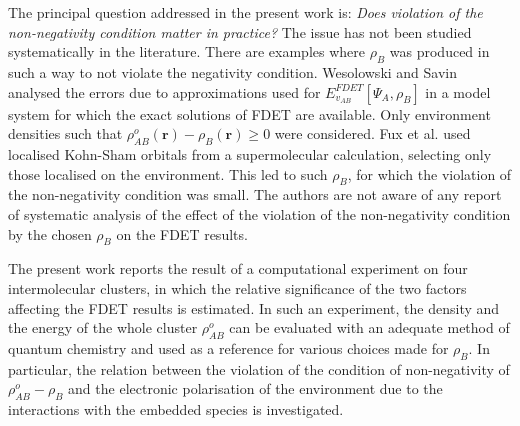\documentclass[amsmath,amssymb,preprint,aip,jcp]{revtex4-1}
\begin{document}
The principal question addressed in the present work is: {\it Does violation of the non-negativity condition matter in practice?} 
The issue has not been studied systematically in the literature.
 There are examples where $\rho_B$ was produced in such a way to not violate the negativity condition. 
Wesolowski and Savin analysed the errors due to approximations used for ${E}_{v_{AB}}^{FDET}[\Psi_{A},\rho_B]$ in a model system for which the exact solutions of FDET are available. Only environment densities such that $\rho_{AB}^o(\mathbf{r})-\rho_B(\mathbf{r}) \geq 0$ were considered. \cite{Wesolowski2013}
Fux et al. \cite{Fux2010} used localised Kohn-Sham orbitals from a supermolecular calculation, selecting only those localised on the environment. This led to such $\rho_B$, for which  the violation of the non-negativity condition was small.  The authors are not aware of any report of systematic analysis of the effect of the violation of the non-negativity condition by the chosen  $\rho_B$ on the FDET results.

The present work reports the result of a computational experiment on four intermolecular clusters, in which the relative significance 
of the two factors affecting the FDET results is estimated. In such an experiment, the density and the energy of the whole cluster $\rho_{AB}^o$ can be evaluated with an adequate method of quantum chemistry and used as a reference for various choices made for $\rho_B$.
In particular, the relation between the violation of the condition of non-negativity of $\rho_{AB}^o-\rho_B$ and the electronic polarisation of the environment due to the interactions with the embedded species is investigated.
\end{document}
